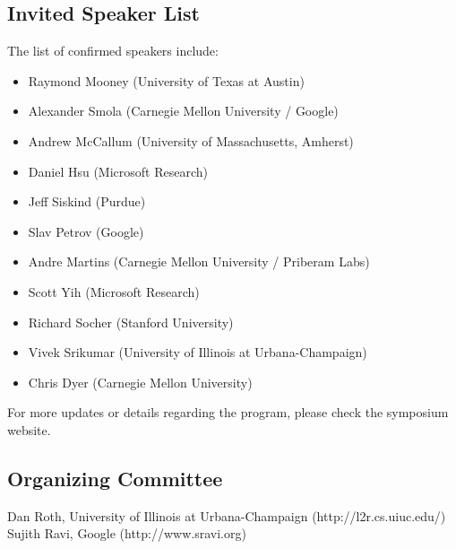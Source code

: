 \subsection*{Invited Speaker List}

The list of confirmed speakers include:
%
\begin{itemize}
\item Raymond Mooney (University of Texas at Austin)
\item Alexander Smola (Carnegie Mellon University / Google)
\item Andrew McCallum (University of Massachusetts, Amherst)
\item Daniel Hsu (Microsoft Research)
\item Jeff Siskind (Purdue)
\item Slav Petrov (Google)
\item Andre Martins (Carnegie Mellon University / Priberam Labs)
\item Scott Yih (Microsoft Research)
\item Richard Socher (Stanford University)
\item Vivek Srikumar (University of Illinois at Urbana-Champaign)
\item Chris Dyer (Carnegie Mellon University)
\end{itemize}

For more updates or details regarding the program, please check the symposium website.

\subsection*{Organizing Committee}
%
\noindent Dan Roth, University of Illinois at Urbana-Champaign (http://l2r.cs.uiuc.edu/) \\
\noindent Sujith Ravi, Google (http://www.sravi.org)
